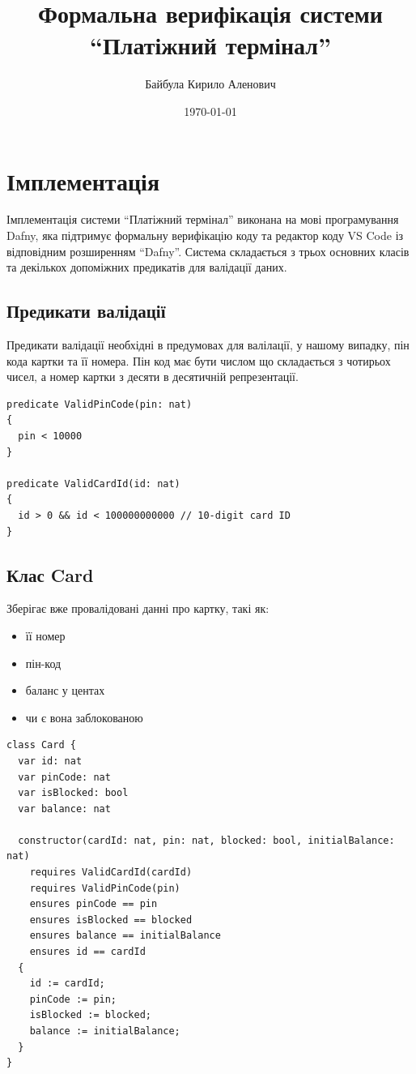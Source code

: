 \documentclass[12pt]{article}
\author{Байбула Кирило Аленович}
\date{\today}
\title{Формальна верифікація системи “Платіжний термінал”}
\begin{document}
\maketitle

\section*{Імплементація}

Імплементація системи “Платіжний термінал” виконана на мові
програмування Dafny, яка підтримує формальну верифікацію коду та
редактор коду VS Code із відповідним розширенням “Dafny”. Система
складається з трьох основних класів та декількох допоміжних предикатів
для валідації даних.

\subsection*{Предикати валідації}

Предикати валідації необхідні в предумовах для валілації, у нашому
випадку, пін кода картки та її номера. Пін код має бути числом що
складається з чотирьох чисел, а номер картки з десяти в десятичній
репрезентації.

\begin{lstlisting}
predicate ValidPinCode(pin: nat)
{
  pin < 10000
}

predicate ValidCardId(id: nat)
{
  id > 0 && id < 100000000000 // 10-digit card ID 
}
\end{lstlisting}

\subsection*{Клас Card}

Зберігає вже провалідовані данні про картку, такі як:

\begin{itemize}
\item її номер
\item пін-код
\item баланс у центах
\item чи є вона заблокованою
\end{itemize}

\begin{lstlisting}
class Card {
  var id: nat
  var pinCode: nat
  var isBlocked: bool
  var balance: nat

  constructor(cardId: nat, pin: nat, blocked: bool, initialBalance: nat)
    requires ValidCardId(cardId)
    requires ValidPinCode(pin)
    ensures pinCode == pin
    ensures isBlocked == blocked
    ensures balance == initialBalance
    ensures id == cardId
  {
    id := cardId;
    pinCode := pin;
    isBlocked := blocked;
    balance := initialBalance;
  }
}
\end{lstlisting}
\end{document}
